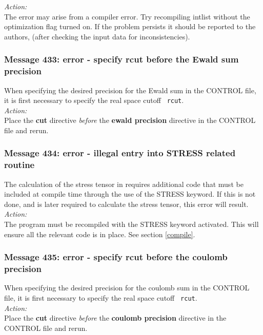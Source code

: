 \noindent
{\em Action:} \\
The error may arise from a compiler error. Try recompiling {\sc intlist}
without the optimization flag turned on. If the problem persists it 
should be reported to
the authors, (after checking the input data for inconsistencies).

\subsubsection*{Message 433: error - specify rcut before the Ewald sum
precision}

When specifying the desired precision for the Ewald sum  in the CONTROL
file, it is first necessary to specify the real space cutoff {\tt
rcut}.\\

\noindent
{\em Action:} \\ Place the {\bf cut} directive {\em before} the {\bf
ewald precision} directive in the CONTROL file and rerun.

\subsubsection*{Message 434: error - illegal entry into STRESS related
routine} 

The calculation of the stress tensor  in \D{} requires
additional code that must be included at compile time through the use
of the STRESS keyword. If this is not done, and \D{} is
later required to calculate the stress tensor, this error will
result.\\

\noindent
{\em Action:}\\
The program must be recompiled with the STRESS keyword activated. This
will ensure all the relevant code is in place. See section \ref{compile}.

\subsubsection*{Message 435: error - specify rcut before the coulomb
precision}

When specifying the desired precision for the coulomb sum in the CONTROL
file, it is first necessary to specify the real space cutoff {\tt
rcut}.\\

\noindent
{\em Action:} \\ Place the {\bf cut} directive {\em before} the {\bf
coulomb precision} directive in the CONTROL file and rerun.

